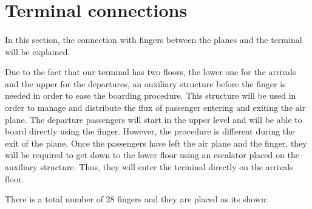 	\section{Terminal connections}
	\paragraph{}In this section, the connection with fingers between the planes and the terminal will be explained. 
	
	Due to the fact that our terminal has two floors, the lower one for the arrivals and the upper for the departures, an auxiliary structure before the finger is needed in order to ease the boarding procedure. This structure will be used in order to manage and distribute the flux of passenger entering and exiting the air plane. The departure passengers will start in the upper level and will be able to board directly using the finger. However, the procedure is different during the exit of the plane. Once the passengers have left the air plane and the finger, they will be required to get down to the lower floor using an escalator placed on the auxiliary structure. Thus, they will enter the terminal directly on the arrivals floor.
	
	There is a total number of 28 fingers and they are placed as its shown:

